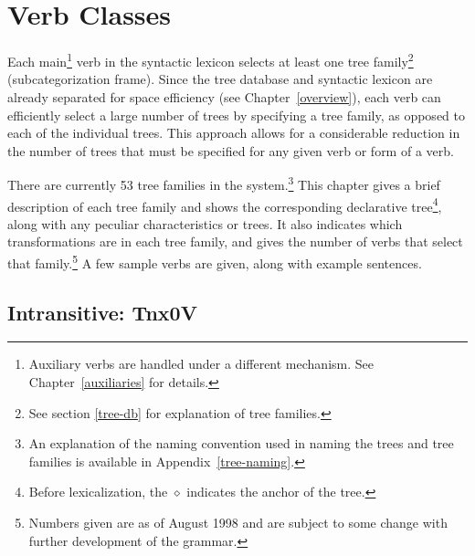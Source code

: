 
\chapter{Verb Classes}
\label{verb-classes}

Each main\footnote{Auxiliary verbs are handled under a different
mechanism.  See Chapter~\ref{auxiliaries} for details.} verb in the
syntactic lexicon selects at least one tree family\footnote{See
section \ref{tree-db} for explanation of tree families.}
(subcategorization frame).  Since the tree database and syntactic
lexicon are already separated for space efficiency (see
Chapter~\ref{overview}), each verb can efficiently select a large
number of trees by specifying a tree family, as opposed to each of the
individual trees.  This approach allows for a considerable reduction
in the number of trees that must be specified for any given verb or
form of a verb.

There are currently 53 tree families in the system.\footnote{An
  explanation of the naming convention used in naming the trees and
  tree families is available in Appendix~\ref{tree-naming}.}  This
chapter gives a brief description of each tree family and shows the
corresponding declarative tree\footnote{Before lexicalization, the
  $\diamond$ indicates the anchor of the tree.}, along with any
peculiar characteristics or trees.  It also indicates which
transformations are in each tree family, and gives the number of verbs
that select that family.\footnote{Numbers given are as of August 1998
  and are subject to some change with further development of the
  grammar.} A few sample verbs are given, along with example
sentences.


\section{Intransitive: Tnx0V}
\label{nx0V-family}

